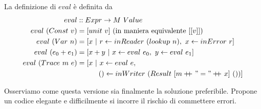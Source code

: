 La definizione di $eval$ è definita da
\begin{align*}
  eval &:: Expr \to M\ Value\\
  eval\ (Const\ v) &= [unit\ v]\ (\text{in maniera equivalente}\ [[v]])\\
  eval\ (Var\ n) &= [x\ |\ r \leftarrow inReader\ (lookup\ n),\ x \leftarrow inError\ r]\\
  eval\ (e_0 + e_1) &= [x+y\ |\ x \leftarrow eval\ e_0,\ y \leftarrow eval\ e_1]\\
  eval\ (Trace\ m\ e) &= [x\ |\ x \leftarrow eval\ e,\\
                      &\qquad\quad () \leftarrow inWriter\ (Result\ [m \doubleplus "=" \doubleplus x]\ ())]
\end{align*}

Osserviamo come questa versione sia finalmente la soluzione preferibile.
Propone un codice elegante e difficilmente si incorre il rischio di commettere
errori.